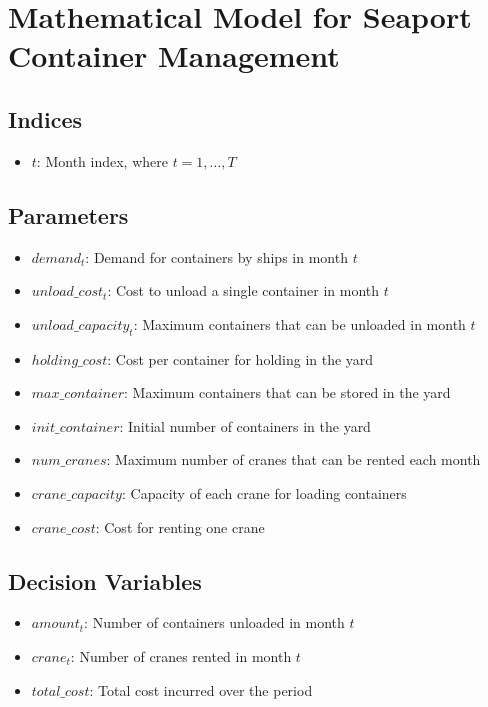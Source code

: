 \documentclass{article}
\begin{document}
\section*{Mathematical Model for Seaport Container Management}

\subsection*{Indices}
\begin{itemize}
    \item $t$: Month index, where $t = 1, \ldots, T$
\end{itemize}

\subsection*{Parameters}
\begin{itemize}
    \item $demand_t$: Demand for containers by ships in month $t$
    \item $unload\_cost_t$: Cost to unload a single container in month $t$
    \item $unload\_capacity_t$: Maximum containers that can be unloaded in month $t$
    \item $holding\_cost$: Cost per container for holding in the yard
    \item $max\_container$: Maximum containers that can be stored in the yard
    \item $init\_container$: Initial number of containers in the yard
    \item $num\_cranes$: Maximum number of cranes that can be rented each month
    \item $crane\_capacity$: Capacity of each crane for loading containers
    \item $crane\_cost$: Cost for renting one crane
\end{itemize}

\subsection*{Decision Variables}
\begin{itemize}
    \item $amount_t$: Number of containers unloaded in month $t$
    \item $crane_t$: Number of cranes rented in month $t$
    \item $total\_cost$: Total cost incurred over the period
\end{itemize}
\end{document}
